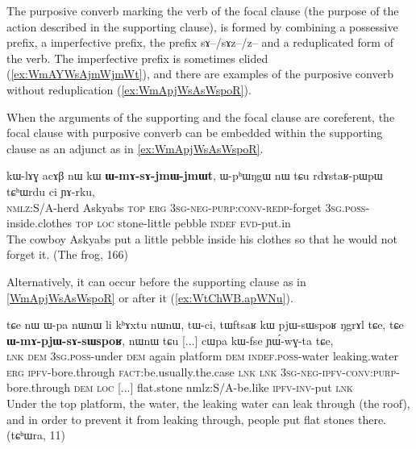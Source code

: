 \documentclass[oldfontcommands,oneside,a4paper,11pt]{article}
\newcommand{\ipa}[1]{{\phon \mbox{#1}}} %
\begin{document}
The purposive converb marking the verb of the focal clause (the purpose of the action described in the supporting clause), is formed by combining a possessive prefix, a imperfective prefix, the prefix \ipa{sɤ}--/\ipa{sɤz}--/\ipa{z}-- and a reduplicated form of the verb. The imperfective prefix is sometimes elided (\ref{ex:WmAYWsAjmWjmWt}), and there are examples of the purposive converb without reduplication (\ref{ex:WmApjWsAsWspoR}).

When the arguments of the supporting and the focal clause are coreferent, the focal clause with purposive converb can be embedded within the supporting clause as an adjunct as in \ref{ex:WmApjWsAsWspoR}.
%
\begin{exe}
\ex \label{ex:WmAYWsAjmWjmWt}
\gll
  \ipa{kɯ-lɤɣ}   	\ipa{acɤβ}   	\ipa{nɯ}   	\ipa{kɯ}   	\ipa{\textbf{ɯ-mɤ-sɤ-jmɯ-jmɯt}},   	\ipa{ɯ-pʰɯŋgɯ}   	\ipa{nɯ}   	\ipa{tɕu}   	\ipa{rdɤstaʁ-pɯpɯ}   	\ipa{tɕʰɯrdu}   	\ipa{ci}  \ipa{ɲɤ-rku,}\\
 \textsc{nmlz}:S/A-herd Askyabs \textsc{top} \textsc{erg}  \textsc{3sg-neg-purp:conv-redp}-forget \textsc{3sg.poss}-inside.clothes \textsc{top} \textsc{loc} stone-little pebble \textsc{indef}
 \textsc{evd}-put.in\\
\glt The cowboy Askyabs put a little pebble inside his clothes so that he would not forget it. (The frog, 166)
\end{exe}
 
Alternatively, it can occur   before the supporting clause as in \ref{WmApjWsAsWspoR} or after it (\ref{ex:WtChWB.apWNu}).

\begin{exe}
\ex \label{ex:WmApjWsAsWspoR}
\gll
\ipa{tɕe}   	\ipa{nɯ}   	\ipa{ɯ-pa}   	\ipa{nɯnɯ}   	\ipa{li}   	\ipa{kʰɤxtu}   	\ipa{nɯnɯ,}   	\ipa{tɯ-ci,}   	\ipa{tɯftsaʁ}   	\ipa{kɯ}   	\ipa{pjɯ-sɯspoʁ}   	\ipa{ŋgrɤl}   	\ipa{tɕe,}    \ipa{tɕe}   	\ipa{\textbf{ɯ-mɤ-pjɯ-sɤ-sɯspoʁ},}   	\ipa{nɯnɯ}   	\ipa{tɕu}   [...] \ipa{cɯpa}   	\ipa{kɯ-fse}   	\ipa{ɲɯ́-wɣ-ta}   	\ipa{tɕe,}   \\
\textsc{lnk} \textsc{dem} \textsc{3sg.poss}-under \textsc{dem} again platform \textsc{dem} \textsc{indef.poss}-water leaking.water \textsc{erg} \textsc{ipfv}-bore.through \textsc{fact}:be.usually.the.case \textsc{lnk} \textsc{lnk} \textsc{3sg-neg-ipfv-conv:purp}-bore.through \textsc{dem} \textsc{loc} [...] flat.stone nm\textsc{}lz:S/A-be.like \textsc{ipfv-inv}-put \textsc{lnk} \\
\glt Under the top platform, the water, the leaking water can leak through (the roof), and in order to prevent it from leaking through, people put flat stones there. (tɕʰɯra, 11)
\end{exe}
\end{document}
